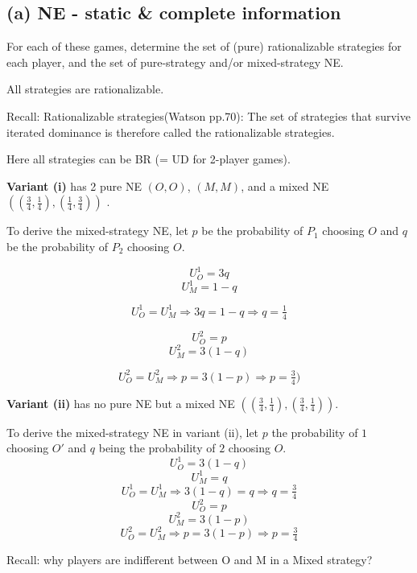 \documentclass{article}
\begin{document}
%
\subsection*{(a) NE - static \& complete information}
For each of these games, determine the set of (pure) rationalizable strategies for each
player, and the set of pure-strategy and/or mixed-strategy NE.

\bigskip 

All strategies are rationalizable. 

\begin{mdframed}[backgroundcolor=blue!20,linecolor=white]
Recall: Rationalizable strategies(Watson pp.70): The set of strategies that
survive iterated dominance is therefore called the rationalizable strategies.

Here all strategies can be BR (= UD for 2-player games).
\end{mdframed}


\textbf{Variant (i)} has 2 pure NE $(O,O)$, $(M,M)$,  and a mixed NE $\left( \left( \tfrac34, \tfrac14 \right), \left( \tfrac14, \tfrac34 \right) \right)$ .

\medskip

To derive the mixed-strategy NE, let $p$ be the probability of $P_1$ choosing $O$ and $q$ be the probability of $P_2$ choosing $O$. 

$$U^1_O=3q$$ 
$$U^1_M=1-q$$

$$U^1_O = U^1_M \Rightarrow 3q = 1-q \Rightarrow q = \tfrac14$$

$$U^2_O=p$$ 
$$U^2_M=3(1-q)$$

$$U^2_O = U^2_M \Rightarrow p = 3(1-p) \Rightarrow p = \tfrac34)$$

\bigskip

\textbf{Variant (ii)}  has no pure NE but a mixed NE $\left( \left( \tfrac34, \tfrac14 \right), \left( \tfrac34, \tfrac14 \right) \right)$.

\medskip

To derive the mixed-strategy NE in variant (ii), let $p$ the probability of $1$ choosing $O'$ and $q$ being the probability of $2$ choosing $O$. 
$$U^1_O=3(1-q)$$ 
$$U^1_M=q$$
$$U^1_O = U^1_M \Rightarrow 3(1-q) = q \Rightarrow q = \tfrac34$$
$$U^2_O=p$$ 
$$U^2_M=3(1-p)$$
$$U^2_O = U^2_M \Rightarrow p = 3(1-p) \Rightarrow p = \tfrac34$$
\begin{mdframed}[backgroundcolor=blue!20,linecolor=white]
Recall: why players are indifferent between O and M in a Mixed strategy?
\end{mdframed}
\end{document}
